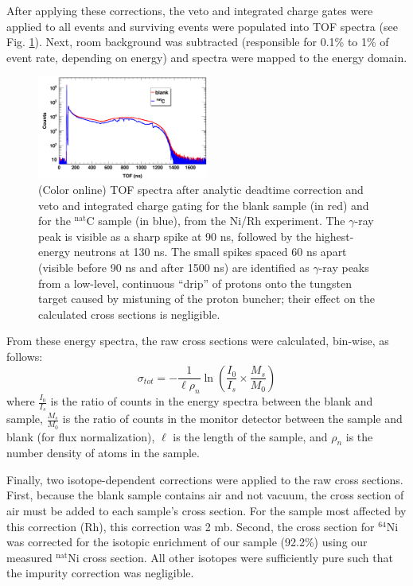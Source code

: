 \documentclass[twocolumn,secnumarabic,amssymb, nobibnotes, aps, prl,
superscriptaddress, nobalancelastpage]{revtex4}
\newcommand{\tot}{\ensuremath{\sigma_{tot}}}
\begin{document}
After applying these corrections, the veto and integrated charge gates were applied to 
all events and surviving events were populated into TOF spectra (see Fig.
\ref{ExampleTOFSpectrum}). Next, room background was subtracted (responsible for 0.1\% to 
1\% of event rate, depending on energy) and spectra were mapped to the energy domain.
\begin{figure}
    \includegraphics[width=0.5\textwidth]{figures/exampleTOFSpectrum.png}
    \caption{(Color online) TOF spectra after analytic deadtime correction and
        veto and integrated charge gating for the blank sample (in
        red) and for the $^{\text{nat}}$C sample (in blue), from the Ni/Rh experiment.
        The $\gamma$-ray peak is visible as a sharp spike at 90 ns, followed by
        the highest-energy neutrons at 130 ns. The small spikes spaced 60 ns
        apart (visible before 90 ns and after 1500
        ns) are identified as $\gamma$-ray peaks from a low-level, continuous
        ``drip'' 
        of protons onto the tungsten target caused by mistuning of the proton 
        buncher; their effect on the calculated cross sections is negligible.
    }
    \label{ExampleTOFSpectrum}
\end{figure}

From these energy spectra, the raw cross sections were calculated, bin-wise, as follows:
$$
\tot = -\frac{1}{\ell\rho_{n}}
\ln \left(\frac{I_{0}}{I_{s}}\times\frac{M_{s}}{M_{0}}\right)
$$
where $\frac{I_{0}}{I_{s}}$ is the ratio of counts in the energy spectra between 
the blank and sample, $\frac{M_{s}}{M_{0}}$ is the ratio of counts in the
monitor detector between the sample and blank (for flux normalization), $\ell$ is the length 
of the sample, and $\rho_{n}$ is the number density of atoms in the sample.

Finally, two isotope-dependent corrections were applied to the raw cross
sections. First, because the blank sample contains air and not vacuum,
the cross section of air must be added to each sample's cross section.
For the sample most affected by this correction (Rh), this correction was 2 mb.
Second, the cross section for $^{64}$Ni was corrected for the isotopic enrichment of our
sample (92.2\%) using our measured $^{\text{nat}}$Ni cross section. All other isotopes were 
sufficiently pure such that the impurity correction was negligible.
\end{document}

